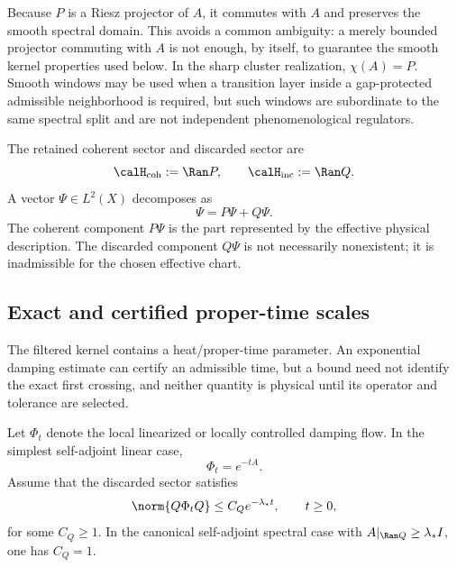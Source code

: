 \documentclass[11pt]{article}
\begin{document}
Because \(P\) is a Riesz projector of \(A\), it commutes with \(A\) and preserves the smooth
spectral domain. This avoids a common ambiguity: a merely bounded projector commuting with
\(A\) is not enough, by itself, to guarantee the smooth kernel properties used below. In the
sharp cluster realization, \(\chi(A)=P\). Smooth windows may be used when a transition layer
inside a gap-protected admissible neighborhood is required, but such windows are subordinate
to the same spectral split and are not independent phenomenological regulators.

\begin{definition}
\label{def:coh-discarded-sectors}
The retained coherent sector and discarded sector are
\begin{equation}
  \calH_{\rm coh}:=\Ran P,
  \qquad
  \calH_{\rm inc}:=\Ran Q.
\end{equation}
A vector \(\Psi\in L^2(X)\) decomposes as
\begin{equation}
  \Psi=P\Psi+Q\Psi.
\end{equation}
The coherent component \(P\Psi\) is the part represented by the effective physical description.
The discarded component \(Q\Psi\) is not necessarily nonexistent; it is inadmissible for the
chosen effective chart.
\end{definition}

\subsection{Exact and certified proper-time scales}
\label{subsec:damping-selected-time}

The filtered kernel contains a heat/proper-time parameter. An exponential damping estimate
can certify an admissible time, but a bound need not identify the exact first crossing, and
neither quantity is physical until its operator and tolerance are selected.

Let \(\Phi_t\) denote the local linearized or locally controlled damping flow. In the simplest
self-adjoint linear case,
\begin{equation}
  \Phi_t=e^{-tA}.
\end{equation}
Assume that the discarded sector satisfies
\begin{equation}
  \norm{Q\Phi_tQ}
  \le
  C_Qe^{-\lambda_\ast t},
  \qquad
  t\ge0,
  \label{eq:discarded-sector-bound}
\end{equation}
for some \(C_Q\ge1\). In the canonical self-adjoint spectral case with
\(A|_{\Ran Q}\ge\lambda_\ast I\), one has \(C_Q=1\).
\end{document}
